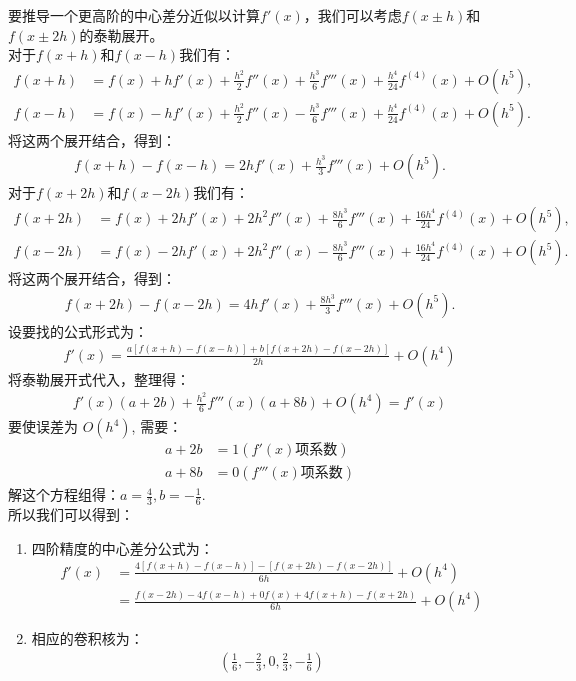 \documentclass[UTF8]{ctexart}
\begin{document}
	要推导一个更高阶的中心差分近似以计算$f'(x)$，我们可以考虑$f(x \pm h)$和$f(x \pm 2h)$的泰勒展开。\\
	对于$f(x + h)$和$f(x - h)$我们有：
	\begin{align*}
		f(x+h) &= f(x) + hf'(x) + \frac{h^2}{2} f''(x) + \frac{h^3}{6} f'''(x) + \frac{h^4}{24} f^{(4)}(x) + O(h^5), \\
		f(x-h) &= f(x) - hf'(x) + \frac{h^2}{2} f''(x) - \frac{h^3}{6} f'''(x) + \frac{h^4}{24} f^{(4)}(x) + O(h^5).
	\end{align*}
	将这两个展开结合，得到：
	\begin{align*}
		f(x+h) - f(x-h) = 2h f'(x) + \frac{h^3}{3} f'''(x) + O(h^5).
	\end{align*}
	对于$f(x + 2h)$和$f(x - 2h)$我们有：
	\begin{align*}
		f(x + 2h) &= f(x) + 2h f'(x) + 2h^2 f''(x) + \frac{8h^3}{6} f'''(x) + \frac{16h^4}{24} f^{(4)}(x) + O(h^5), \\
		f(x - 2h) &= f(x) - 2h f'(x) + 2h^2 f''(x) - \frac{8h^3}{6} f'''(x) + \frac{16h^4}{24} f^{(4)}(x) + O(h^5).
	\end{align*}	
	将这两个展开结合，得到：
	\begin{align*}
		f(x + 2h) - f(x - 2h) = 4hf'(x) + \frac{8h^3}{3}f'''(x) + O(h^5).
	\end{align*}
	设要找的公式形式为：
	\begin{align*}
		f'(x) = \frac {a [f (x+h)-f (x-h)] + b [f (x+2h)-f (x-2h)]}{2h} + O (h^4)
	\end{align*}
	将泰勒展开式代入，整理得：
	\begin{align*}
		f'(x)(a+2b) + \frac{h^2}{6}f'''(x)(a+8b) + O(h^4) = f'(x)
	\end{align*}
	要使误差为 $O (h^4)$, 需要：
	\begin{align*}
		a+2b&=1 (f'(x)\text{项系数})\\
		a+8b&=0 (f'''(x)\text{项系数})
	\end{align*}
	解这个方程组得：$a=\frac{4}{3},b=-\frac{1}{6}$.\\
	所以我们可以得到：
	\begin{enumerate}
		\item  	四阶精度的中心差分公式为：
		\begin{align*}
			f'(x) &= \frac{4[f(x+h)-f(x-h)] - [f(x+2h)-f(x-2h)]}{6h} + O(h^4)\\
			&=\frac{f(x-2h) - 4f(x-h) + 0f(x) + 4f(x+h) - f(x+2h)}{6h} + O(h^4)
		\end{align*}
		\item 	相应的卷积核为：
		\begin{align*}
			(\frac {1}{6}, -\frac {2}{3}, 0, \frac {2}{3}, -\frac {1}{6})
		\end{align*}
	\end{enumerate}


	

	
	
\end{document}
